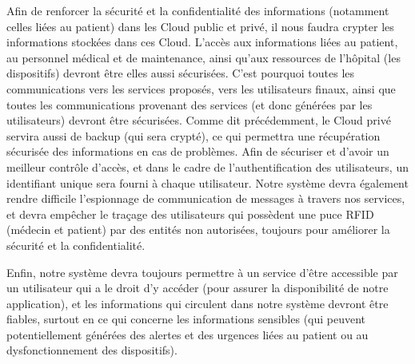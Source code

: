 Afin de renforcer la sécurité et la confidentialité des informations (notamment celles liées au patient) dans les Cloud public et privé, il nous faudra crypter les informations stockées dans ces Cloud. L'accès aux informations liées au patient, au personnel médical et de maintenance, ainsi qu'aux ressources de l'hôpital (les dispositifs) devront être elles aussi sécurisées. C'est pourquoi toutes les communications vers les services proposés, vers les utilisateurs finaux, ainsi que toutes les communications provenant des services (et donc générées par les utilisateurs) devront être sécurisées. Comme dit précédemment, le Cloud privé servira aussi de backup (qui sera crypté), ce qui permettra une récupération sécurisée des informations en cas de problèmes. Afin de sécuriser et d'avoir un meilleur contrôle d'accès, et dans le cadre de l'authentification des utilisateurs, un identifiant unique sera fourni à chaque utilisateur. Notre système devra également rendre difficile l'espionnage de communication de messages à travers nos services, et devra empêcher le traçage des utilisateurs qui possèdent une puce RFID (médecin et patient) par des entités non autorisées, toujours pour améliorer la sécurité et la confidentialité. 

Enfin, notre système devra toujours permettre à un service d'être accessible par un utilisateur qui a le droit d'y accéder (pour assurer la disponibilité de notre application), et les informations qui circulent dans notre système devront être fiables, surtout en ce qui concerne les informations sensibles (qui peuvent potentiellement générées des alertes et des urgences liées au patient ou au dysfonctionnement des dispositifs).